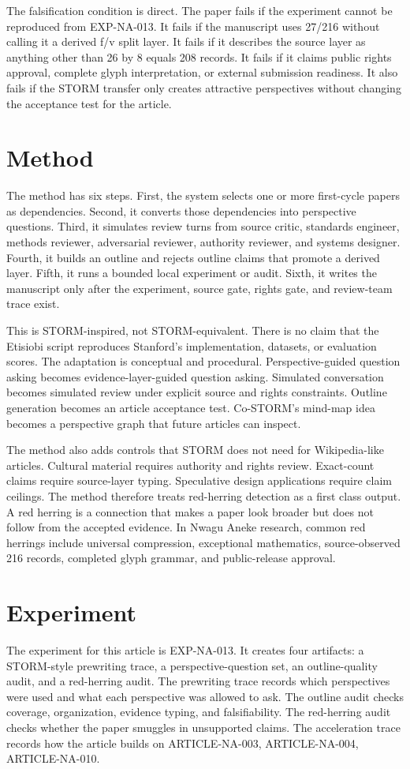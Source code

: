 \documentclass[sigconf,nonacm]{acmart}
\begin{document}
The falsification condition is direct. The paper fails if the experiment cannot
be reproduced from EXP-NA-013. It fails if the manuscript uses 27/216 without
calling it a derived f/v split layer. It fails if it describes the source layer
as anything other than 26 by 8 equals 208 records. It fails if it claims public
rights approval, complete glyph interpretation, or external submission readiness.
It also fails if the STORM transfer only creates attractive perspectives without
changing the acceptance test for the article.

\section{Method}
The method has six steps. First, the system selects one or more first-cycle
papers as dependencies. Second, it converts those dependencies into perspective
questions. Third, it simulates review turns from source critic, standards
engineer, methods reviewer, adversarial reviewer, authority reviewer, and
systems designer. Fourth, it builds an outline and rejects outline claims that
promote a derived layer. Fifth, it runs a bounded local experiment or audit.
Sixth, it writes the manuscript only after the experiment, source gate, rights
gate, and review-team trace exist.

This is STORM-inspired, not STORM-equivalent. There is no claim that the
Etisiobi script reproduces Stanford's implementation, datasets, or evaluation
scores. The adaptation is conceptual and procedural. Perspective-guided question
asking becomes evidence-layer-guided question asking. Simulated conversation
becomes simulated review under explicit source and rights constraints. Outline
generation becomes an article acceptance test. Co-STORM's mind-map idea becomes
a perspective graph that future articles can inspect.

The method also adds controls that STORM does not need for Wikipedia-like
articles. Cultural material requires authority and rights review. Exact-count
claims require source-layer typing. Speculative design applications require
claim ceilings. The method therefore treats red-herring detection as a first
class output. A red herring is a connection that makes a paper look broader but
does not follow from the accepted evidence. In Nwagu Aneke research, common red
herrings include universal compression, exceptional mathematics, source-observed
216 records, completed glyph grammar, and public-release approval.

\section{Experiment}
The experiment for this article is EXP-NA-013. It creates four artifacts: a
STORM-style prewriting trace, a perspective-question set, an outline-quality
audit, and a red-herring audit. The prewriting trace records which perspectives
were used and what each perspective was allowed to ask. The outline audit checks
coverage, organization, evidence typing, and falsifiability. The red-herring
audit checks whether the paper smuggles in unsupported claims. The acceleration
trace records how the article builds on ARTICLE-NA-003, ARTICLE-NA-004, ARTICLE-NA-010.
\end{document}
